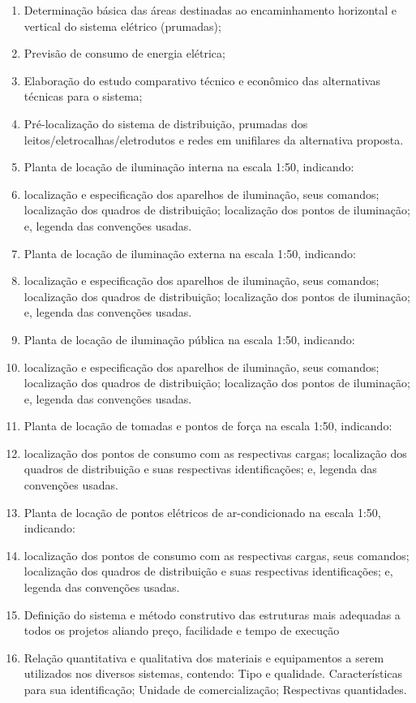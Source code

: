 \begin{enumerate}
	\item Determinação básica das áreas destinadas ao encaminhamento horizontal e vertical do sistema elétrico (prumadas);
	\item Previsão de consumo de energia elétrica;
	\item Elaboração do estudo comparativo técnico e econômico das alternativas técnicas para o sistema;
	\item Pré-localização do sistema de distribuição, prumadas dos leitos/eletrocalhas/eletrodutos e redes em unifilares da alternativa proposta.
	\item Planta de locação de iluminação interna na escala 1:50,  indicando: 
	\item localização e especificação dos aparelhos de iluminação, seus comandos; localização dos quadros de distribuição; localização dos pontos de iluminação; e, legenda das convenções usadas.
	\item Planta de locação de iluminação externa na escala 1:50,  indicando: 
	\item localização e especificação dos aparelhos de iluminação, seus comandos; localização dos quadros de distribuição; localização dos pontos de iluminação; e, legenda das convenções usadas.
	\item Planta de locação de iluminação pública na escala 1:50,  indicando: 
	\item localização e especificação dos aparelhos de iluminação, seus comandos; localização dos quadros de distribuição; localização dos pontos de iluminação; e, legenda das convenções usadas.
	\item Planta de locação de tomadas e pontos de força na escala 1:50, indicando: 
	\item localização dos pontos de consumo com as respectivas cargas; localização dos quadros de distribuição e suas respectivas identificações; e, legenda das convenções usadas.
	\item Planta de locação de pontos elétricos de ar-condicionado na escala 1:50, indicando: 
	\item localização dos pontos de consumo com as respectivas cargas, seus comandos; localização dos quadros de distribuição e suas respectivas identificações; e, legenda das convenções usadas.
	\item Definição do sistema e método construtivo das estruturas mais adequadas a todos os projetos aliando preço, facilidade e tempo de execução
	\item Relação quantitativa e qualitativa dos materiais e equipamentos a serem utilizados nos diversos sistemas, contendo: Tipo e qualidade. Características para sua identificação; Unidade de comercialização; Respectivas quantidades. 
\end{enumerate}
